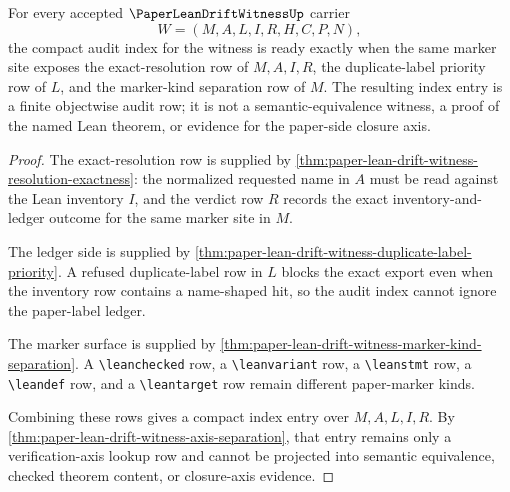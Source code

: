 \begin{theorem}
\label{thm:paperleandriftwitness-audit-index-readiness}
For every accepted $\PaperLeanDriftWitnessUp$ carrier
$$
W=(M,A,L,I,R,H,C,P,N),
$$
the compact audit index for the witness is ready exactly when the same marker site exposes the exact-resolution row of $M,A,I,R$, the duplicate-label priority row of $L$, and the marker-kind separation row of $M$. The resulting index entry is a finite objectwise audit row; it is not a semantic-equivalence witness, a proof of the named Lean theorem, or evidence for the paper-side closure axis.
\end{theorem}
\begin{proof}
The exact-resolution row is supplied by \autoref{thm:paper-lean-drift-witness-resolution-exactness}: the normalized requested name in $A$ must be read against the Lean inventory $I$, and the verdict row $R$ records the exact inventory-and-ledger outcome for the same marker site in $M$.

The ledger side is supplied by \autoref{thm:paper-lean-drift-witness-duplicate-label-priority}. A refused duplicate-label row in $L$ blocks the exact export even when the inventory row contains a name-shaped hit, so the audit index cannot ignore the paper-label ledger.

The marker surface is supplied by \autoref{thm:paper-lean-drift-witness-marker-kind-separation}. A \texttt{\textbackslash leanchecked} row, a \texttt{\textbackslash leanvariant} row, a \texttt{\textbackslash leanstmt} row, a \texttt{\textbackslash leandef} row, and a \texttt{\textbackslash leantarget} row remain different paper-marker kinds.

Combining these rows gives a compact index entry over $M,A,L,I,R$. By \autoref{thm:paper-lean-drift-witness-axis-separation}, that entry remains only a verification-axis lookup row and cannot be projected into semantic equivalence, checked theorem content, or closure-axis evidence.
\end{proof}

